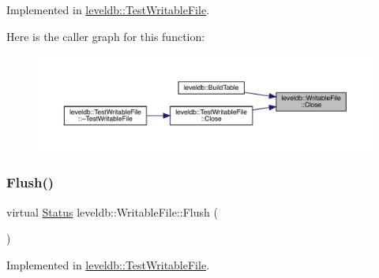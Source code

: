 Implemented in \mbox{\hyperlink{classleveldb_1_1_test_writable_file_a98284f2e88a705a3c18961f198e94038}{leveldb\+::\+Test\+Writable\+File}}.

Here is the caller graph for this function\+:
\nopagebreak
\begin{figure}[H]
\begin{center}
\leavevmode
\includegraphics[width=350pt]{classleveldb_1_1_writable_file_a2efbf9c02a26028b5002df73b4393915_icgraph}
\end{center}
\end{figure}
\mbox{\label{classleveldb_1_1_writable_file_ab95759ad32f6a05b0ee4266969fa265e}} 
\subsubsection{\texorpdfstring{Flush()}{Flush()}}
{\footnotesize\ttfamily virtual \mbox{\hyperlink{classleveldb_1_1_status}{Status}} leveldb\+::\+Writable\+File\+::\+Flush (\begin{DoxyParamCaption}{ }\end{DoxyParamCaption})\hspace{0.3cm}{\ttfamily [pure virtual]}}



Implemented in \mbox{\hyperlink{classleveldb_1_1_test_writable_file_ad25b85a5ef462fe34e208f955c19d58e}{leveldb\+::\+Test\+Writable\+File}}.


